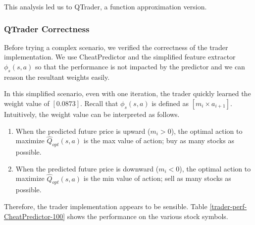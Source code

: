 \documentclass[twocolumn,10pt]{asme2ej}
\begin{document}
This analysis led us to QTrader, a function approximation version.

\subsubsection{QTrader Correctness}

Before trying a complex scenario, we verified the correctness of the
trader implementation. We use CheatPredictor and the simplified
feature extractor $\phi_s(s,a)$ so that the performance is not
impacted by the predictor and we can reason the resultant weights
easily.

In this simplified scenario, even with one iteration, the trader
quickly learned the weight value of $[0.0873]$. Recall that
$\phi_s(s,a)$ is defined as $[m_i \times a_{i+1}]$. Intuitively, the
weight value can be interpreted as follows.

\begin{enumerate}
  \item When the predicted future price is upward ($m_i > 0$), the optimal
    action to maximize $\hat{Q}_{opt}(s, a)$ is the max value of action; buy as
    many stocks as possible.

  \item When the predicted future price is downward ($m_i < 0$), the optimal
    action to maximize $\hat{Q}_{opt}(s, a)$ is the min value of action; sell as
    many stocks as possible.
\end{enumerate}

Therefore, the trader implementation appears to be sensible. Table
\ref{trader-perf-CheatPredictor-100} shows the performance on the
various stock symbols.
\end{document}
